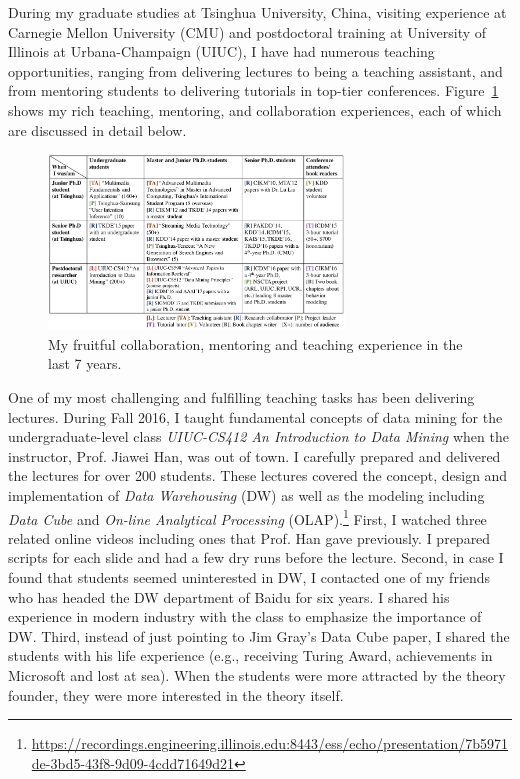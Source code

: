 \documentclass[10.5pt]{article}
\begin{document}
During my graduate studies at Tsinghua University, China, visiting experience at Carnegie Mellon University (CMU) and postdoctoral training at University of Illinois at Urbana-Champaign (UIUC), I have had numerous teaching opportunities, ranging from delivering lectures to being a teaching assistant, and from mentoring students to delivering tutorials in top-tier conferences. Figure~\ref{fig:intro} shows my rich teaching, mentoring, and collaboration experiences, each of which are discussed in detail below.

\vskip 0.12in
\vskip 0.02in

\begin{figure}
\vskip -0.45in
\includegraphics[width=0.7\textwidth]{figure/intro.pdf}
\vskip -0.18in
\caption{My fruitful collaboration, mentoring and teaching experience in the last 7 years.}
\label{fig:intro}
\vskip -0.12in
\end{figure}

\vskip 0.06in
\vskip 0.02in

One of my most challenging and fulfilling teaching tasks has been delivering lectures. During Fall 2016, I taught fundamental concepts of data mining for the undergraduate-level class \textit{UIUC-CS412 An Introduction to Data Mining} when the instructor, Prof. Jiawei Han, was out of town. I carefully prepared and delivered the lectures for over 200 students. These lectures covered the concept, design and implementation of \textit{Data Warehousing} (DW) as well as the modeling including \textit{Data Cube} and \textit{On-line Analytical Processing} (OLAP).\footnote{\url{https://recordings.engineering.illinois.edu:8443/ess/echo/presentation/7b5971de-3bd5-43f8-9d09-4cdd71649d21}} First, I watched three related online videos including ones that Prof. Han gave previously. I prepared scripts for each slide and had a few dry runs before the lecture. Second, in case I found that students seemed uninterested in DW, I contacted one of my friends who has headed the DW department of Baidu for six years. I shared his experience in modern industry with the class to emphasize the importance of DW. Third, instead of just pointing to Jim Gray's Data Cube paper, I shared the students with his life experience (e.g., receiving Turing Award, achievements in Microsoft and lost at sea). When the students were more attracted by the theory founder, they were more interested in the theory itself.
\end{document}

